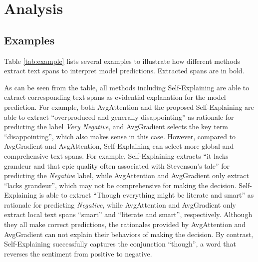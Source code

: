\documentclass[11pt,a4paper]{article}
\begin{document}
\section{Analysis}
\subsection{Examples}
Table \ref{tab:example} lists several examples to illustrate how different  methods extract text spans to interpret model predictions. Extracted spans are in bold. 

As can be seen from the table, all methods including Self-Explaining are able to extract corresponding text spans as evidential explanation for the model prediction. For example, both AvgAttention and the proposed Self-Explaining are able to extract ``overproduced and generally disappointing'' as rationale for predicting the label {\it Very Negative}, and AvgGradient selects the key term ``disappointing'', which also makes sense in this case.
However, compared to AvgGradient and AvgAttention, Self-Explaining can select more global and comprehensive text spans. For example, Self-Explaining extracts ``it lacks grandeur and that epic quality often associated with Stevenson’s tale'' for predicting the {\it Negative} label, while AvgAttention and AvgGradient only extract ``lacks grandeur'', which may not be comprehensive for making the decision. Self-Explaining is able to extract ``Though everything might be literate and smart'' as rationale for predicting {\it Negative}, while AvgAttention and AvgGradient only extract local text spans ``smart'' and ``literate and smart'',  respectively. Although they all  make correct predictions, the rationales provided by  AvgAttention and AvgGradient can not explain their behaviors of making the decision. By contrast, Self-Explaining successfully captures the conjunction ``though'', a word that  reverses the sentiment from positive to negative.
\end{document}
